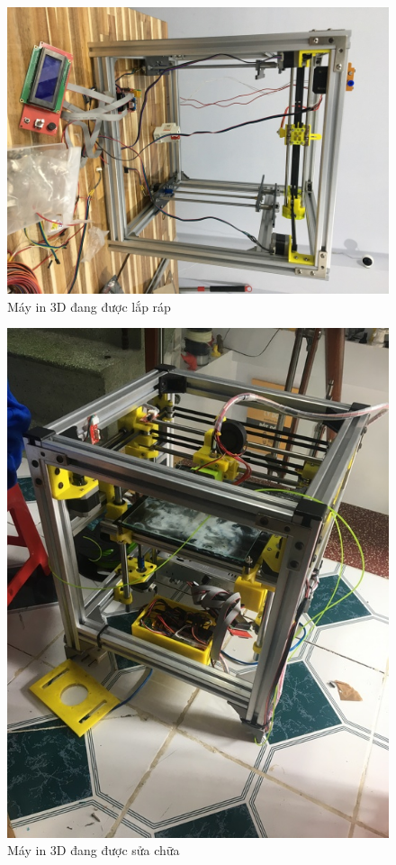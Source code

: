 \begin{figure}[!ht]
\centering
\includegraphics[scale=0.3]{images/img_0372_resized.jpg}
\caption{Máy in 3D đang được lắp ráp}
\label{img:3d_printer_assembling}
\end{figure}

\begin{figure}[!ht]
\centering
\includegraphics[scale=0.4]{images/img_0364_resized.jpg}
\caption{Máy in 3D đang được sửa chữa}
\label{img:3d_printer_fixing}
\end{figure}

